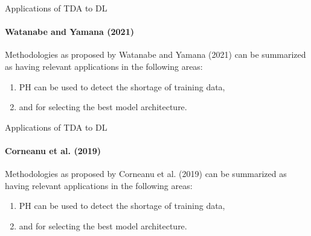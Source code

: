 \documentclass[pdf]{beamer}
\begin{document}
    \begin{frame}{Applications of TDA to DL}
        \framesubtitle{Watanabe and Yamana (2021)}

        Methodologies as proposed by Watanabe and Yamana (2021) can be summarized as having relevant 
        applications in the following areas:

        \begin{enumerate}
            \item PH can be used to detect the shortage of training data,
            \item and for selecting the best model architecture.
        \end{enumerate}
    \end{frame}

    \begin{frame}{Applications of TDA to DL}
        \framesubtitle{Corneanu et al. (2019)}

        Methodologies as proposed by Corneanu et al. (2019) can be summarized as having relevant
        applications in the following areas:

        \begin{enumerate}
            \item PH can be used to detect the shortage of training data,
            \item and for selecting the best model architecture.
        \end{enumerate}
    \end{frame}
\end{document}
